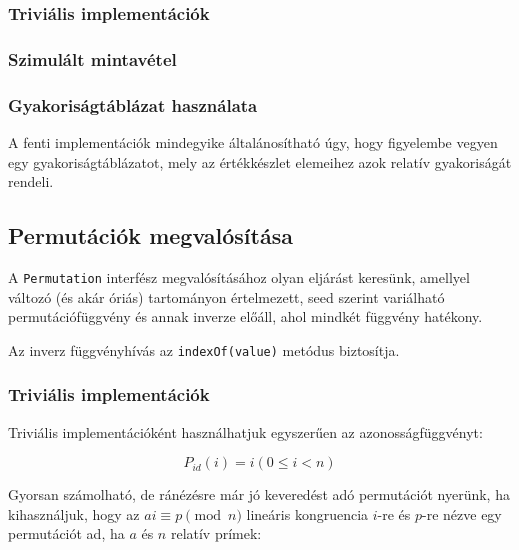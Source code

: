 \documentclass[
    parspace,
    noindent,
    nohyp,
]{elteiktdk}[2023/04/10]
\begin{document}
\subsubsection{Triviális implementációk}



\subsubsection{Szimulált mintavétel}



\subsubsection{Gyakoriságtáblázat használata}

A fenti implementációk mindegyike általánosítható úgy, hogy figyelembe vegyen egy gyakoriságtáblázatot,
mely az értékkészlet elemeihez azok relatív gyakoriságát rendeli.


\subsection{Permutációk megvalósítása}

A \texttt{Permutation} interfész megvalósításához olyan eljárást keresünk, amellyel változó (és akár óriás) tartományon értelmezett,
seed szerint variálható permutációfüggvény és annak inverze előáll, ahol mindkét függvény hatékony.

Az inverz függvényhívás az \texttt{indexOf(value)} metódus biztosítja.

\subsubsection{Triviális implementációk}

Triviális implementációként használhatjuk egyszerűen az azonosságfüggvényt:

$$
P_{id}(i) = i (0 \leq i < n)
$$

Gyorsan számolható, de ránézésre már jó keveredést adó permutációt nyerünk, ha kihasználjuk, hogy az $ai \equiv p \pmod{n}$ lineáris kongruencia
$i$-re és $p$-re nézve egy permutációt ad, ha $a$ és $n$ relatív prímek:
\end{document}
